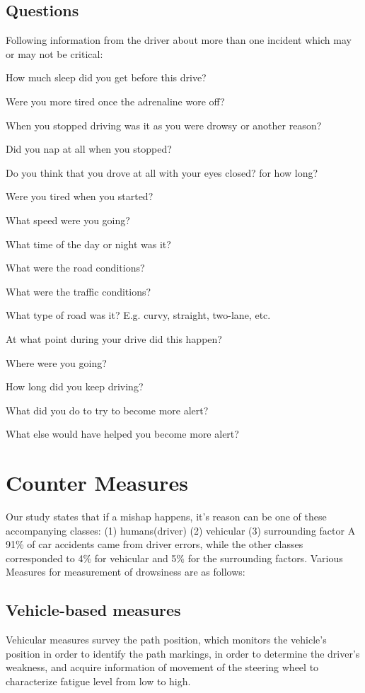 \documentclass{article}
\begin{document}
\subsection{Questions}

Following information from the driver about more than one incident which may or may not be critical:


How much sleep did you get before this drive? 


Were you more tired once the adrenaline wore off? 


When you stopped driving was it as you were drowsy or another reason?

 
 Did you nap at all when you stopped? 


 Do you think that you drove at all with your eyes closed? for how long?


Were you tired when you started? 


What speed were you going? 


What time of the day or night was it? 


What were the road conditions? 


What were the traffic conditions? 


What type of road was it? E.g. curvy, straight, two-lane, etc. 


At what point during your drive did this happen? 


Where were you going? 


How long did you keep driving?  


What did you do to try to become more alert?  


What else would have helped you become more alert? 
 

\newpage

\section{Counter Measures}
Our study states that if a mishap happens, it’s reason can be one of these accompanying classes:
(1)	humans(driver)
(2)	vehicular
(3)	surrounding factor
A 91\% of car accidents came from driver errors, while the other classes corresponded to 4\% for vehicular and 5\% for the surrounding factors. Various Measures for measurement of drowsiness are as follows:


\subsection{Vehicle-based measures}
Vehicular measures survey the path position, which monitors the vehicle's position in order to identify the path markings, in order to determine the driver’s weakness, and acquire information of movement of the steering wheel to characterize fatigue level from low to high.
\end{document}
